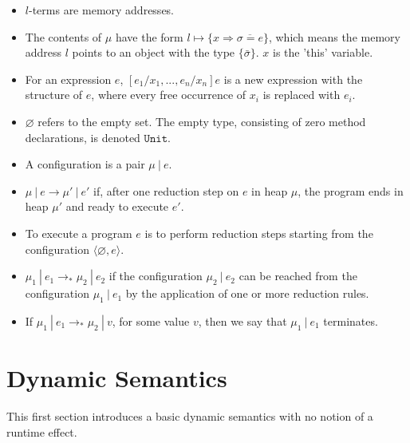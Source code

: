\documentclass{llncs}
\newcommand{\keywadj}[1]{\mathtt{#1}}
\newcommand{\config}[1] { \langle #1 \rangle }
\begin{document}
\begin{itemize}
	\item $l$-terms are memory addresses.
	\item The contents of $\mu$ have the form $l \mapsto \{ x \Rightarrow \overline{\sigma = e}\}$, which means the memory address $l$ points to an object with the type $\{ \bar \sigma \}$. $x$ is the 'this' variable.
	\item For an expression $e$, $[e_1/x_1, ..., e_n/x_n]e$ is a new expression with the structure of $e$, where every free occurrence of $x_i$ is replaced with $e_i$.
	\item $\varnothing$ refers to the empty set. The empty type, consisting of zero method declarations, is denoted $\keywadj{Unit}$.
	\item A configuration is a pair $\mu~|~ e$.
	\item $\mu~|~e \longrightarrow \mu'~|~e'$ if, after one reduction step on $e$ in heap $\mu$, the program ends in heap $\mu'$ and ready to execute $e'$.
	\item To execute a program $e$ is to perform reduction steps starting from the configuration $\config{\varnothing, e}$.
	\item $\mu_1~|~e_1 \longrightarrow_* \mu_2~|~e_2$ if the configuration $\mu_2~|~e_2$ can be reached from the configuration $\mu_1~|~e_1$ by the application of one or more reduction rules.
	\item If $\mu_1~|~e_1 \longrightarrow_* \mu_2~|~v$, for some value $v$, then we say that $\mu_1~|~e_1$ terminates.
\end{itemize}

\newpage

\section{Dynamic Semantics}

This first section introduces a basic dynamic semantics with no notion of a runtime effect.
\\

\end{document}
